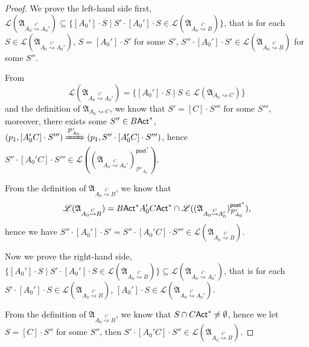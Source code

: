 \documentclass[preprint,12pt]{elsarticle}
\newcommand\Pp{{\mathcal{P} }}
\newcommand\act{{\sf Act}}
\newcommand\post{{\mathsf{post} }}
\newcommand\Aut{{\mathfrak{A} }}
\newcommand\Lang{{\mathscr{L} }}
\begin{document}
{\begin{proof}
    We prove the left-hand side first, $\Lang(\Aut_{A_0\stackrel{C}\rightsquigarrow A_0'}) \subseteq \{[A_0']\cdot S \mid S'\cdot [A_0']\cdot S\in\Lang(\Aut_{A_0\stackrel{C}\rightsquigarrow B})\}$, that is for each 
    $S\in\Lang(\Aut_{A_0\stackrel{C}\rightsquigarrow A_0'})$, $S = [A_0']\cdot S'$ for some $S'$, $S''\cdot[A_0']\cdot S'\in\Lang(\Aut_{A_0\stackrel{C}\rightsquigarrow B})$ for some $S''$.

    From 
    $$\Lang(\Aut_{A_0\stackrel{C}\rightsquigarrow A_0'}) = \{[A_0']\cdot S\mid S\in \Lang(\Aut_{A_0\rightsquigarrow C})\}$$
    and the definition of $\Aut_{A_0\rightsquigarrow C}$, we know that $S' = [C]\cdot S'''$ for some $S'''$, 
    moreover, there exists some $S''\in B\act^*$, $(p_1,[A_0'C]\cdot S''')\xRightarrow{\Pp_{A_0}'}(p_1, S''\cdot [A_0'C]\cdot S''')$, hence $S''\cdot [A_0'C]\cdot S''' \in \Lang((\Aut_{A_0\stackrel{C}\rightsquigarrow A_0'})^{\post^*}_{\Pp'_{A_0}})$.

    From the definition of $\Aut_{A_0\stackrel{C}\rightsquigarrow B}$, we know that $$\Lang(\Aut_{A_0\stackrel{C}\rightsquigarrow B}) = B\act^*A_0'C\act^*\cap\Lang((\Aut_{A_0\stackrel{C}\rightsquigarrow A_0'})^{\post^*}_{\Pp'_{A_0}}),$$
    hence we have $S''\cdot[A_0']\cdot S' = S''\cdot[A_0'C]\cdot S''' \in\Lang(\Aut_{A_0\stackrel{C}\rightsquigarrow B})$.

    Now we prove the right-hand side, $\{[A_0']\cdot S \mid S'\cdot [A_0']\cdot S\in\Lang(\Aut_{A_0\stackrel{C}\rightsquigarrow B})\}\subseteq \Lang(\Aut_{A_0\stackrel{C}\rightsquigarrow A_0'})$, that is for each 
    $S'\cdot[A_0']\cdot S\in\Lang(\Aut_{A_0\stackrel{C}\rightsquigarrow B})$, $[A_0']\cdot S\in\Lang(\Aut_{A_0\stackrel{C}\rightsquigarrow A_0'})$.
    

    From the definition of $\Aut_{A_0\stackrel{C}\rightsquigarrow B}$, we know that $S\cap C\act^*\neq\emptyset$, hence we let $S = [C]\cdot S''$ for some $S''$, then $S'\cdot[A_0'C]\cdot S''\in\Lang(\Aut_{A_0\stackrel{C}\rightsquigarrow B})$. 
    

\end{proof}}
\end{document}
